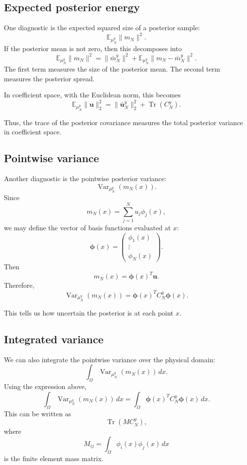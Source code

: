 \documentclass[11pt,a4paper]{book}
\newcommand{\post}{\mu^y}
\begin{document}
\subsection{Expected posterior energy}

One diagnostic is the expected squared size of a posterior sample:
\[
    \mathbb{E}_{\post_N}\|m_N\|^2.
\]
If the posterior mean is not zero, then this decomposes into
\[
    \mathbb{E}_{\post_N}\|m_N\|^2
    =
    \|\bar{m}_N^y\|^2
    +
    \mathbb{E}_{\post_N}\|m_N-\bar{m}_N^y\|^2.
\]
The first term measures the size of the posterior mean. The second term
measures the posterior spread.

In coefficient space, with the Euclidean norm, this becomes
\[
    \mathbb{E}_{\post_N}\|\bm{u}\|_2^2
    =
    \|\bar{\bm{u}}_N^y\|_2^2
    +
    \operatorname{Tr}(C_N^y).
\]

Thus, the trace of the posterior covariance measures the total posterior
variance in coefficient space.

\subsection{Pointwise variance}

Another diagnostic is the pointwise posterior variance:
\[
    \operatorname{Var}_{\post_N}(m_N(x)).
\]
Since
\[
    m_N(x)
    =
    \sum_{j=1}^N u_j\phi_j(x),
\]
we may define the vector of basis functions evaluated at $x$:
\[
    \bm{\phi}(x)
    =
    \begin{pmatrix}
        \phi_1(x)\\
        \vdots\\
        \phi_N(x)
    \end{pmatrix}.
\]
Then
\[
    m_N(x)
    =
    \bm{\phi}(x)^T\bm{u}.
\]
Therefore,
\[
    \operatorname{Var}_{\post_N}(m_N(x))
    =
    \bm{\phi}(x)^T C_N^y \bm{\phi}(x).
\]

This tells us how uncertain the posterior is at each point $x$.

\subsection{Integrated variance}

We can also integrate the pointwise variance over the physical domain:
\[
    \int_{\Omega}
    \operatorname{Var}_{\post_N}(m_N(x))\,dx.
\]
Using the expression above,
\[
    \int_{\Omega}
    \operatorname{Var}_{\post_N}(m_N(x))\,dx
    =
    \int_{\Omega}
    \bm{\phi}(x)^T C_N^y \bm{\phi}(x)\,dx.
\]
This can be written as
\[
    \operatorname{Tr}(M C_N^y),
\]
where
\[
    M_{ij}
    =
    \int_{\Omega}\phi_i(x)\phi_j(x)\,dx
\]
is the finite element mass matrix.
\end{document}
